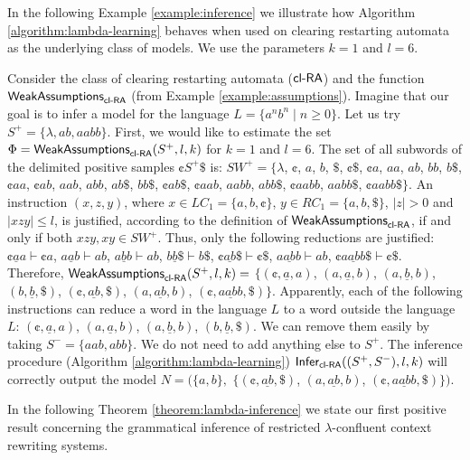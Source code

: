 In the following Example \ref{example:inference} we illustrate how Algorithm \ref{algorithm:lambda-learning} behaves when used on clearing restarting automata as the underlying class of models. We use the parameters $k = 1$ and $l = 6$.

\begin{example}[\citep{C12}]\label{example:inference}
Consider the class of clearing restarting automata ($\textup{\sf cl-RA\/}$) and the function $ \textup{\sf WeakAssumptions}_{\textup{\sf cl-RA\/}}$ (from Example \ref{example:assumptions}). Imagine that our goal is to infer a model for the language $L = \{ a^n b^n \mid n \ge 0 \}$. Let us try $S^+ = \{\lambda, ab, aabb\}$. First, we would like to estimate the set $\Phi = \textup{\sf WeakAssumptions}_{\textup{\sf cl-RA\/}}(S^+, l, k)$  for $k = 1$ and $l = 6$. The set of all subwords of the delimited positive samples $\cent S^+ \$$ is:
$SW^+ = \{\lambda$, $\cent$, $a$, $b$, $\$$,
$\cent \$$, $\cent a$, $aa$, $ab$, $bb$, $b \$$,
$\cent aa$, $\cent ab$, $aab$, $abb$, $ab \$$, $bb \$$,
$\cent ab \$$, $\cent aab$, $aabb$, $abb \$$,
$\cent aabb$, $aabb \$$, $\cent aabb \$ \}.$
An instruction $(x, z, y)$, where $x \in LC_1 = \{a, b, \cent\}$,
$y \in RC_1 = \{a, b, \$\}$, $|z| > 0$ and $|xzy| \le l$, is justified, according to the definition of $\textup{\sf WeakAssumptions}_{\textup{\sf cl-RA\/}}$, if and only if both $xzy, xy \in SW^+$. Thus, only the following reductions are justified:
$\cent \underline{a} a \vdash \cent a$,
$a \underline{a} b \vdash ab$,
$a \underline{b} b \vdash ab$,
$b \underline{b} \$ \vdash b\$$,
$\cent \underline{ab} \$ \vdash \cent \$$,
$a \underline{ab} b \vdash ab$,
$\cent \underline{aabb} \$ \vdash \cent \$$.
Therefore, $\textup{\sf WeakAssumptions}_{\textup{\sf cl-RA\/}}(S^+, l, k) = $
$\{(\cent, \underline{a}, a)$,
$(a, \underline{a}, b)$,
$(a, \underline{b}, b)$,
$(b, \underline{b}, \$)$,
$(\cent, \underline{ab}, \$)$,
$(a, \underline{ab}, b)$,
$(\cent, \underline{aabb}, \$) \}$.
Apparently, each of the following instructions can reduce a word in the language $L$ to a word outside the language $L$:
$(\cent, \underline{a}, a)$,
$(a, \underline{a}, b)$,
$(a, \underline{b}, b)$,
$(b, \underline{b}, \$)$.
We can remove them easily by taking $S^- = \{ aab, abb \}$. We do not need to add anything else to $S^+$. The inference procedure (Algorithm \ref{algorithm:lambda-learning}) $\textup{\sf Infer}_{\textup{\sf cl-RA\/}}((S^+, S^-), l, k)$ will correctly output the model $N = (\{a, b\}, $
$\{(\cent, \underline{ab}, \$)$,
$(a, \underline{ab}, b) $,
$(\cent, \underline{aabb}, \$) \})$.
\end{example}

In the following Theorem \ref{theorem:lambda-inference} we state our first positive result concerning the grammatical inference of restricted $\lambda$-confluent context rewriting systems.

